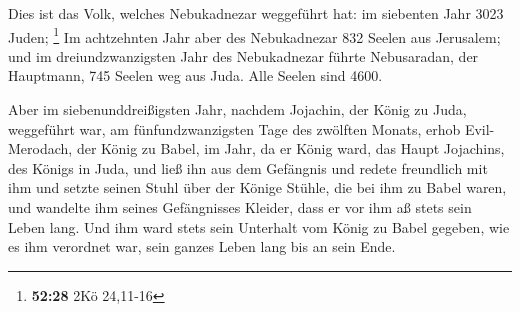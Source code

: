  Dies ist das Volk, welches Nebukadnezar weggeführt hat:
im siebenten Jahr 3023 Juden; \footnote{\textbf{52:28} 2Kö 24,11-16}
 Im achtzehnten Jahr aber des Nebukadnezar 832 Seelen aus
Jerusalem;  und im dreiundzwanzigsten Jahr des
Nebukadnezar führte Nebusaradan, der Hauptmann, 745 Seelen weg aus Juda.
Alle Seelen sind 4600.

 Aber im siebenunddreißigsten Jahr, nachdem Jojachin, der
König zu Juda, weggeführt war, am fünfundzwanzigsten Tage des zwölften
Monats, erhob Evil-Merodach, der König zu Babel, im Jahr, da er König
ward, das Haupt Jojachins, des Königs in Juda, und ließ ihn aus dem
Gefängnis  und redete freundlich mit ihm und setzte
seinen Stuhl über der Könige Stühle, die bei ihm zu Babel waren,
 und wandelte ihm seines Gefängnisses Kleider, dass er
vor ihm aß stets sein Leben lang.  Und ihm ward stets
sein Unterhalt vom König zu Babel gegeben, wie es ihm verordnet war,
sein ganzes Leben lang bis an sein Ende.
